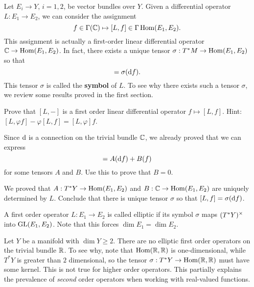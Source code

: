\documentclass{amsart}
\begin{document}
\begin{defn}
  Let $E_{i}\to Y$, $i=1,2$, be vector bundles over $Y$. Given a differential operator $L:E_{1}\to E_{2}$, we can consider the assignment
  \begin{equation*}
    f\in \Gamma(\mathbb{C})\mapsto [L,f]\in \Gamma\operatorname{\mathrm{Hom}}(E_{1},E_{2}).
  \end{equation*}
  This assignment is actually a first-order linear differential operator $\mathbb{C}\to \operatorname{\mathrm{Hom}}(E_{1},E_{2})$. In fact, there exists a unique tensor $\sigma:T^{*}M\to \operatorname{\mathrm{Hom}}(E_{1},E_{2})$ so that
  \begin{equation*}
    [L,f]=\sigma(\d f).
  \end{equation*}
  This tensor $\sigma$ is called the \textbf{symbol} of $L$. To see why there exists such a tensor $\sigma$, we review some results proved in the first section.

  \begin{xca}
    Prove that $[L,-]$ is a first order linear differential operator $f\mapsto [L,f]$. Hint: $[L,\varphi f]-\varphi[L,f]=[L,\varphi]f$.    
  \end{xca}
  \begin{xca}
    Since $\mathrm{d}$ is a connection on the trivial bundle $\mathbb{C}$, we already proved that we can express
    \begin{equation*}
      [L,f]=A(\d f)+B(f)
    \end{equation*}
    for some tensors $A$ and $B$. Use this to prove that $B=0$.

    We proved that $A:T^{*}Y\to \operatorname{\mathrm{Hom}}(E_{1},E_{2})$ and $B:\mathbb{C}\to \operatorname{\mathrm{Hom}}(E_{1},E_{2})$ are uniquely determined by $L$. Conclude that there is unique tensor $\sigma$ so that $[L,f]=\sigma(\mathrm{d} f)$.
  \end{xca}
  \end{defn}
  \begin{defn}
    A first order operator $L:E_{1}\to E_{2}$ is called elliptic if its symbol $\sigma$ maps $(T^{*}Y)^{\times}$ into $\mathrm{GL}(E_{1},E_{2})$. Note that this forces $\dim E_{1}=\dim E_{2}$.    
  \end{defn}
  \begin{example}
    Let $Y$ be a manifold with $\dim Y\ge 2$. There are no elliptic first order operators on the trivial bundle $\mathbb{R}$. To see why, note that $\operatorname{\mathrm{Hom}}(\mathbb{R},\mathbb{R})$ is one-dimensional, while $T^{*}Y$ is greater than $2$ dimensional, so the tensor $\sigma:T^{*}Y\to \operatorname{\mathrm{Hom}}(\mathbb{R},\mathbb{R})$ must have some kernel. This is not true for higher order operators. This partially explains the prevalence of \emph{second} order operators when working with real-valued functions.
  \end{example}
\end{document}
